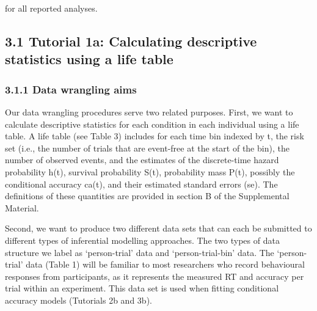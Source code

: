 \documentclass[
  man, donotrepeattitle,floatsintext]{apa6}
\begin{document}
for all reported analyses.

\subsection{3.1 Tutorial 1a: Calculating descriptive statistics using a life table}\label{tutorial-1a-calculating-descriptive-statistics-using-a-life-table}

\subsubsection{3.1.1 Data wrangling aims}\label{data-wrangling-aims}

Our data wrangling procedures serve two related purposes. First, we want to calculate descriptive statistics for each condition in each individual using a life table. A life table (see Table 3) includes for each time bin indexed by t, the risk set (i.e., the number of trials that are event-free at the start of the bin), the number of observed events, and the estimates of the discrete-time hazard probability h(t), survival probability S(t), probability mass P(t), possibly the conditional accuracy ca(t), and their estimated standard errors (se). The definitions of these quantities are provided in section B of the Supplemental Material.

Second, we want to produce two different data sets that can each be submitted to different types of inferential modelling approaches. The two types of data structure we label as `person-trial' data and `person-trial-bin' data. The `person-trial' data (Table 1) will be familiar to most researchers who record behavioural responses from participants, as it represents the measured RT and accuracy per trial within an experiment. This data set is used when fitting conditional accuracy models (Tutorials 2b and 3b).
\end{document}
